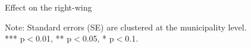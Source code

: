 \documentclass[xcolor=dvipsnames, aspectratio=169]{beamer}
\begin{document}
\begin{frame}[label=right]{Effect on the right-wing}


\begin{center}
\begin{table}[h!]
\footnotesize
    \caption{Effect of refugee camp exposure on right-wing votes}
     \resizebox{0.75\textwidth}{!}{}
    \begin{minipage}{\textwidth}  %
    \footnotesize
    \centering 
    \item Note: Standard errors (SE) are clustered at the municipality level. \\ *** p$<$0.01, ** p$<$0.05, * p$<$0.1.
    \end{minipage}
\end{table}
\end{center}

\hyperlink{spatial}{}


\end{frame}
\end{document}
